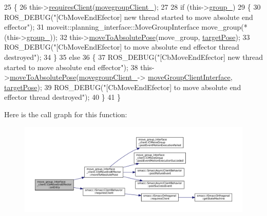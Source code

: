 \begin{DoxyCode}
25 \{
26   this->\hyperlink{classsmacc_1_1ISmaccClientBehavior_a32b16e99e3b4cb289414203dc861a440}{requiresClient}(\hyperlink{classmove__group__interface__client_1_1CbMoveEndEffector_aec44abef326949b57872d68e7b495194}{movegroupClient\_});
27 
28   \textcolor{keywordflow}{if} (this->\hyperlink{classmove__group__interface__client_1_1CbMoveEndEffector_a91cf66e5db59f176ae7c811cc0ebfb91}{group\_})
29   \{
30       ROS\_DEBUG(\textcolor{stringliteral}{"[CbMoveEndEfector] new thread started to move absolute end effector"});
31       moveit::planning\_interface::MoveGroupInterface move\_group(*(this->\hyperlink{classmove__group__interface__client_1_1CbMoveEndEffector_a91cf66e5db59f176ae7c811cc0ebfb91}{group\_}));
32       this->\hyperlink{classmove__group__interface__client_1_1CbMoveEndEffector_a7850f5f9c6fbc040b77e8456a2ecee09}{moveToAbsolutePose}(move\_group, \hyperlink{classmove__group__interface__client_1_1CbMoveEndEffector_a645e7131ef58ab052efbadf53ea82c59}{targetPose});
33       ROS\_DEBUG(\textcolor{stringliteral}{"[CbMoveEndEfector] to move absolute end effector thread destroyed"});
34   \}
35   \textcolor{keywordflow}{else}
36   \{
37       ROS\_DEBUG(\textcolor{stringliteral}{"[CbMoveEndEfector] new thread started to move absolute end effector"});
38       this->\hyperlink{classmove__group__interface__client_1_1CbMoveEndEffector_a7850f5f9c6fbc040b77e8456a2ecee09}{moveToAbsolutePose}(\hyperlink{classmove__group__interface__client_1_1CbMoveEndEffector_aec44abef326949b57872d68e7b495194}{movegroupClient\_}->
      \hyperlink{classmove__group__interface__client_1_1ClMoveGroup_a5f0ea9b52695661b17605691168d1f31}{moveGroupClientInterface}, \hyperlink{classmove__group__interface__client_1_1CbMoveEndEffector_a645e7131ef58ab052efbadf53ea82c59}{targetPose});
39       ROS\_DEBUG(\textcolor{stringliteral}{"[CbMoveEndEfector] to move absolute end effector thread destroyed"});
40   \}
41 \}
\end{DoxyCode}
Here is the call graph for this function\+:
\nopagebreak
\begin{figure}[H]
\begin{center}
\leavevmode
\includegraphics[width=350pt]{classmove__group__interface__client_1_1CbMoveEndEffector_acd7f50c949fcf6e7c56b285439b0b1de_cgraph}
\end{center}
\end{figure}
